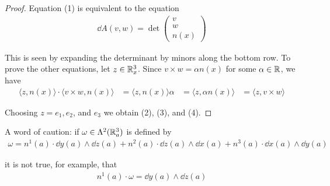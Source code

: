 \begin{proof}
    Equation (1) is equivalent to the equation
    \begin{align*}
        \dd A(v, w) = \det 
        \begin{pmatrix}
            v\\ w\\ n(x)
        \end{pmatrix}
    \end{align*}

    This is seen by expanding the determinant by minors along the bottom row.
    To prove the other equations, let $z\in\mathbb{R}^3_x$. Since $v\times w=\alpha n(x)$ for some 
    $\alpha\in\mathbb{R}$, we have 
    \begin{align*}
        \langle z, n(x)\rangle\cdot \langle v\times w, n(x)\rangle
        & = \langle z, n(x)\rangle\alpha 
        & = \langle z, \alpha n(x)\rangle
        & = \langle z, v\times w\rangle
    \end{align*}

    Choosing $z=e_1, e_2$, and $e_3$ we obtain (2), (3), and (4).
\end{proof}


A word of caution: if $\omega\in \Lambda^2(\mathbb{R}^3_a)$ is defined by 
\begin{align*}
    \omega
    = n^1(a)\cdot \dd y(a)\wedge\dd z(a)
    + n^{2}(a)\cdot\dd z(a)\wedge\dd x(a)
    + n^{3}(a)\cdot\dd x(a)\wedge\dd y(a)
\end{align*}

it is not true, for example, that
\begin{align*}
    n^1(a)\cdot\omega = \dd y(a)\wedge\dd z(a)
\end{align*}

